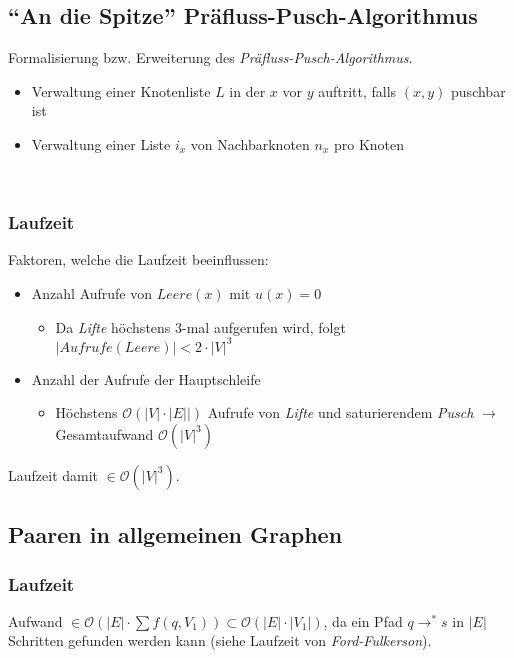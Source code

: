 \subsection{"`An die Spitze"' Präfluss-Pusch-Algorithmus}
Formalisierung bzw. Erweiterung des \textit{Präfluss-Pusch-Algorithmus}.
\begin{itemize}
	\item Verwaltung einer Knotenliste \(L\) in der \(x\) vor \(y\) auftritt, falls \((x,y)\) puschbar ist
	\item Verwaltung einer Liste \(i_x\) von Nachbarknoten \(n_x\) pro Knoten
\end{itemize}

\text{}\\


\subsubsection{Laufzeit}
Faktoren, welche die Laufzeit beeinflussen:
\begin{itemize}
	\item Anzahl Aufrufe von \(Leere(x)\) mit \(u(x) = 0\)
	\begin{itemize}
		\item Da \textit{Lifte} höchstens \(3\)-mal aufgerufen wird, folgt \(|Aufrufe(Leere)| < 2\cdot |V|^3\)
	\end{itemize}
	\item Anzahl der Aufrufe der Hauptschleife
	\begin{itemize}
		\item Höchstens \(\mathcal{O}(|V| \cdot |E||)\) Aufrufe von \textit{Lifte} und saturierendem \textit{Pusch} \(\rightarrow\) Gesamtaufwand \(\mathcal{O}(|V|^3)\)
	\end{itemize}
\end{itemize}
Laufzeit damit \(\in \mathcal{O}(|V|^3)\).



\subsection{Paaren in allgemeinen Graphen}


\subsubsection{Laufzeit}
Aufwand \(\in \mathcal{O}(|E|\cdot \sum f(q, V_1)) \subset \mathcal{O}(|E| \cdot |V_1|)\), da ein Pfad \(q \rightarrow^* s\) in \(|E|\) Schritten gefunden werden kann (siehe Laufzeit von \textit{Ford-Fulkerson}).

